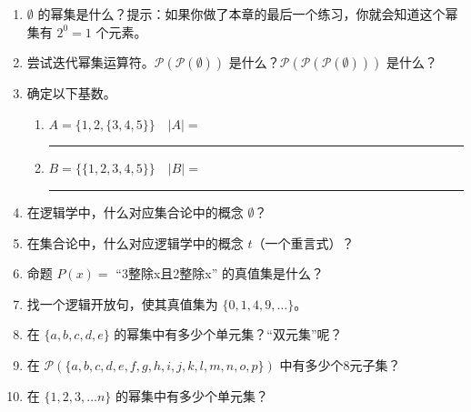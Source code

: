 \begin{enumerate}
  \item 
  $\emptyset$ 的幂集是什么？提示：如果你做了本章的最后一个练习，你就会知道这个幂集有 $2^0 = 1$ 个元素。
  
  \wbvfill
  
  \item 
  尝试迭代幂集运算符。${\mathcal P}({\mathcal P}(\emptyset))$ 是什么？${\mathcal P}({\mathcal P}({\mathcal P}(\emptyset)))$ 是什么？
  
  
  \wbvfill
  
  \workbookpagebreak
  
  \item 
  确定以下基数。
  \begin{enumerate}
      \item $A = \{ 1, 2, \{3, 4, 5\}\} \quad |A| = $\rule{36pt}{1pt}
      \item $B = \{ \{1, 2, 3, 4, 5\} \} \quad |B| = $\rule{36pt}{1pt}  
    \end{enumerate}
  
  
  \wbvfill
  
  \item 
  在逻辑学中，什么对应集合论中的概念 $\emptyset$？
  \wbvfill
  
  \item 
  在集合论中，什么对应逻辑学中的概念 $t$（一个重言式）？
  \wbvfill
  
  \item 
  命题 $P(x) = $ “3整除x且2整除x” 的真值集是什么？
  \wbvfill
  
  \workbookpagebreak
  
  \item 
  找一个逻辑开放句，使其真值集为 $\{0, 1, 4, 9, \ldots \}$。
  \wbvfill
  
  
  \item 
  在 $\{a,b,c,d,e\}$ 的幂集中有多少个单元集？“双元集”呢？
  
  \wbvfill
  
  \item 
  
  在 ${\mathcal P}(\{a,b,c,d,e,f,g,h,i,j,k,l,m,n,o,p\})$ 中有多少个8元子集？
  
  \wbvfill
  
  \item 
  
  在 $\{1,2,3, \ldots n\}$ 的幂集中有多少个单元集？
  \wbvfill
  
  \workbookpagebreak
  
  \end{enumerate}
  
  
  
